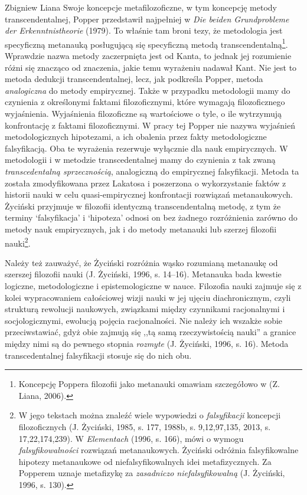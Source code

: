 \begin{artplenv}{Zbigniew Liana}
Swoje koncepcje metafilozoficzne, w tym koncepcję metody transcendentalnej, Popper przedstawił najpełniej w
\textit{Die beiden Grundprobleme der Erkenntnistheorie} \label{ref:RNDZjoA35m8Sx}(1979). To właśnie tam broni tezy, że
metodologia jest specyficzną metanauką posługującą się specyficzną metodą transcendentalną\footnote{Koncepcję Poppera
	filozofii jako metanauki omawiam szczegółowo w \label{ref:RNDfY6Fw7eCi8}(Z. Liana, 2006).}. Wprawdzie nazwa metody
zaczerpnięta jest od Kanta, to jednak jej rozumienie różni się znacząco od znaczenia, jakie temu wyrażeniu nadawał
Kant. Nie jest to metoda dedukcji transcendentalnej, lecz, jak podkreśla Popper, metoda \textit{analogiczna} do metody
empirycznej. Także w przypadku metodologii mamy do czynienia z określonymi faktami filozoficznymi, które wymagają
filozoficznego wyjaśnienia. Wyjaśnienia filozoficzne są wartościowe o tyle, o ile wytrzymują konfrontację z faktami
filozoficznymi. W pracy tej Popper nie nazywa wyjaśnień metodologicznych hipotezami, a ich obalenia przez fakty
metodologiczne falsyfikacją. Oba te wyrażenia rezerwuje wyłącznie dla nauk empirycznych. W metodologii i w metodzie
transcedentalnej mamy do czynienia z tak zwaną \textit{transcedentalną sprzecznością}, analogiczną do empirycznej
falsyfikacji. Metoda ta została zmodyfikowana przez Lakatosa i poszerzona o wykorzystanie faktów z historii nauki w
celu quasi-empirycznej konfrontacji rozwiązań metanaukowych. Życiński przyjmuje w filozofii identyczną transcendentalną
metodę, z tym że terminy ‘falsyfikacja’ i ‘hipoteza’ odnosi on bez żadnego rozróżnienia zarówno do metody nauk
empirycznych, jak i do metody metanauki lub szerzej filozofii nauki\footnote{W jego tekstach można znaleźć wiele
	wypowiedzi o \textit{falsyfikacji }koncepcji filozoficznych \label{ref:RNDlMUuFKby8S}(J. Życiński, 1985, s. 177, 1988b,
	s. 9,12,97,135, 2013, s. 17,22,174,239).  W \textit{Elementach} \label{ref:RNDCkkQxwcbWF}(1996, s. 166), mówi o wymogu
	\textit{falsyfikowalności} rozwiązań metanaukowych. Życiński odróżnia falsyfikowalne hipotezy metanaukowe od
	niefalsyfikowalnych idei metafizycznych. Za Popperem uznaje metafizykę za \textit{zasadniczo niefalsyfikowalną
	}\label{ref:RNDA2elxmxDEm}(J. Życiński, 1996, s. 130).}.

Należy też zauważyć, że Życiński rozróżnia wąsko rozumianą metanaukę od szerszej filozofii nauki
\label{ref:RNDSXNKAbqry1}(J. Życiński, 1996, s. 14–16). Metanauka bada kwestie logiczne, metodologiczne i
epistemologiczne w nauce. Filozofia nauki zajmuje się z kolei wypracowaniem całościowej wizji nauki w jej ujęciu
diachronicznym, czyli strukturą rewolucji naukowych, związkami między czynnikami racjonalnymi i socjologicznymi,
ewolucją pojęcia racjonalności. Nie należy ich wszakże sobie przeciwstawiać, gdyż obie zajmują się ,,tą samą
rzeczywistością nauki'' a granice między nimi są do pewnego stopnia \textit{rozmyte} \label{ref:RNDJqZXflfCwo}(J.
Życiński, 1996, s. 16). Metoda transcedentalnej falsyfikacji stosuje się do nich obu.


\end{artplenv}

